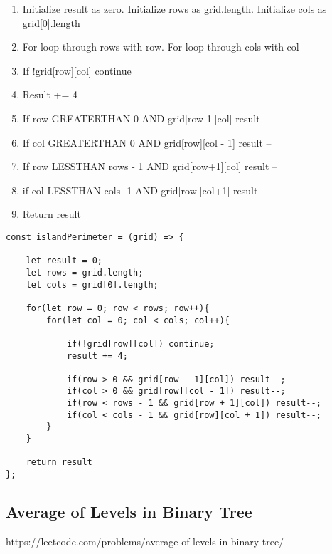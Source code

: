 \documentclass[10pt]{article}
\begin{document}
\begin{enumerate}
	\item Initialize result as zero. Initialize rows as grid.length. Initialize cols as grid[0].length
	\item For loop through rows with row. For loop through cols with col
	\item If !grid[row][col] continue
	\item Result += 4
	\item If row GREATERTHAN 0 AND grid[row-1][col] result --
	\item If col GREATERTHAN 0 AND grid[row][col - 1] result --
	\item If row LESSTHAN rows - 1 AND grid[row+1][col] result --
	\item if col LESSTHAN cols -1 AND grid[row][col+1] result --
	\item Return result
\end{enumerate}

\begin{lstlisting}[title=Solution islandPerimeter, captionpos=t]
const islandPerimeter = (grid) => {
    
    let result = 0;
    let rows = grid.length;
    let cols = grid[0].length;
    
    for(let row = 0; row < rows; row++){
        for(let col = 0; col < cols; col++){
            
            if(!grid[row][col]) continue;
            result += 4;
            
            if(row > 0 && grid[row - 1][col]) result--;
            if(col > 0 && grid[row][col - 1]) result--;
            if(row < rows - 1 && grid[row + 1][col]) result--;
            if(col < cols - 1 && grid[row][col + 1]) result--;
        }
    }
    
    return result
};
\end{lstlisting}

\medskip %










\pagebreak
\medskip   
\subsection {Average of Levels in Binary Tree}
https://leetcode.com/problems/average-of-levels-in-binary-tree/
\end{document}
